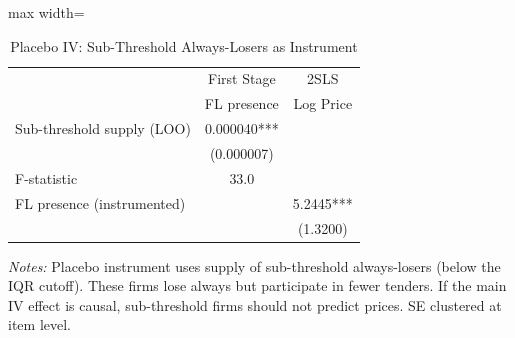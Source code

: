 \begin{table}[htbp]
\centering
\caption{Placebo IV: Sub-Threshold Always-Losers as Instrument}
\label{tab:iv_placebo}
\begin{adjustbox}{max width=\textwidth}
\begin{threeparttable}
\small
\begin{tabular}{lcc}
\toprule
 & First Stage & 2SLS \\
 & FL presence & Log Price \\
\midrule
Sub-threshold supply (LOO) & 0.000040*** & \\
 & (0.000007) & \\
F-statistic & 33.0 & \\
FL presence (instrumented) & & 5.2445*** \\
 & & (1.3200) \\
\bottomrule
\end{tabular}
\begin{tablenotes}
\small
\item \textit{Notes:} Placebo instrument uses supply of sub-threshold
always-losers (below the IQR cutoff). These firms lose always but participate
in fewer tenders. If the main IV effect is causal, sub-threshold firms should
not predict prices. SE clustered at item level.
\end{tablenotes}
\end{threeparttable}
\end{adjustbox}
\end{table}
